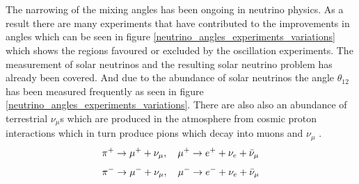 \documentclass[12pt,a4paper]{article}
\begin{document}
\\\\The narrowing of the mixing angles has been ongoing in neutrino physics. As a result there are many experiments that have contributed to the improvements in angles which can be seen in figure \ref{neutrino_angles_experiments_variations} 
 which shows the regions favoured or excluded by the oscillation experiments. The measurement of solar neutrinos and the resulting solar neutrino problem has already been covered. And due to the abundance of solar neutrinos the angle $\theta_{12}$ has been measured frequently as seen in figure \ref{neutrino_angles_experiments_variations}. There are also also an abundance of terrestrial $\nu_\mu$s which are produced in the atmosphere from cosmic proton interactions which in turn produce pions which decay into muons and $\nu_\mu$ \cite{griffiths2008book}\cite{griffiths2008neutrinoOscillations}.
\begin{equation}
    \pi^+ \rightarrow \mu^+ + \nu_\mu,\quad \mu^+ \rightarrow e^+ + \nu_e + \Bar{\nu}_\mu 
    \label{pi_plus_neutrino_production}
\end{equation}
\begin{equation}
    \pi^- \rightarrow \mu^- + \nu_\mu, \quad \mu^- \rightarrow e^- + \nu_e + \Bar{\nu}_\mu 
    \label{pi_minus_neutrino_production}
\end{equation}
\end{document}
